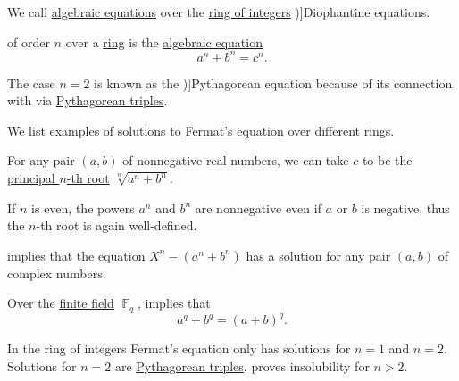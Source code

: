 \begin{definition}\label{def:diophantine_equation}
  We call \hyperref[def:algebraic_equation]{algebraic equations} over the \hyperref[def:integers]{ring of integers} \term[ru=Диофантово уравнение (\cite[\S 1.9]{ШеньВерещагин2017ВычислимыеФункции})]{Diophantine equations}.
\end{definition}

\begin{definition}\label{def:fermats_equation}
   of order \( n \) over a \hyperref[def:ring]{ring} is the \hyperref[def:algebraic_equation]{algebraic equation}
  \begin{equation}\label{eq:def:fermats_equation}
    a^n + b^n = c^n.
  \end{equation}

  The case \( n = 2 \) is known as the \term[en=Pythagorean equation (\cite[\S 4.3.1]{Deza2012FigurateNumbers})]{Pythagorean equation} because of its connection with  via \hyperref[def:pythagorean_triple]{Pythagorean triples}.
\end{definition}

\begin{example}\label{ex:def:fermats_equation}
  We list examples of solutions to \hyperref[def:fermats_equation]{Fermat's equation} over different rings.
  \begin{thmenum}
     For any pair \( (a, b) \) of nonnegative real numbers, we can take \( c \) to be the \hyperref[def:principal_nonnegative_nth_root]{principal \( n \)-th root} \( \sqrt[n]{ a^n + b^n } \).

    If \( n \) is even, the powers \( a^n \) and \( b^n \) are nonnegative even if \( a \) or \( b \) is negative, thus the \( n \)-th root is again well-defined.

      implies that the equation \( X^n - (a^n + b^n) \) has a solution for any pair \( (a, b) \) of complex numbers.

     Over the \hyperref[def:finite_field]{finite field} \( \BbbF_q \),  implies that
    \begin{equation*}
      a^q + b^q = (a + b)^q.
    \end{equation*}

     In the ring of integers Fermat's equation only has solutions for \( n = 1 \) and \( n = 2 \). Solutions for \( n = 2 \) are \hyperref[def:pythagorean_triple]{Pythagorean triples}.  proves insolubility for \( n > 2 \).
  \end{thmenum}
\end{example}

